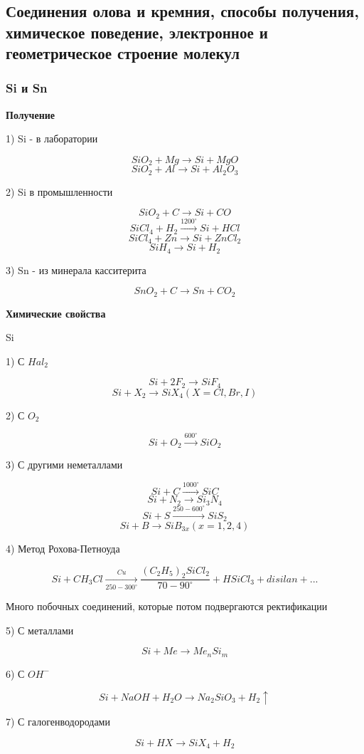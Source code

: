 
\subsection{Соединения олова и кремния, способы получения, химическое поведение, электронное и геометрическое строение молекул}

\subsubsection*{Si и Sn}

\textbf{Получение}

1) Si - в лаборатории

$$SiO_2 + Mg \rightarrow Si + MgO$$
$$SiO_2 + Al \rightarrow Si + Al_2O_3$$

2) Si в промышленности

$$SiO_2 + C \rightarrow Si +  CO$$
$$SiCl_4 + H_2 \xrightarrow{1200^{\circ}} Si + HCl$$
$$SiCl_4 + Zn \rightarrow Si + ZnCl_2$$
$$SiH_4 \rightarrow Si + H_2$$

3) Sn - из минерала касситерита

$$SnO_2 + C \rightarrow Sn + CO_2$$

\textbf{Химические свойства}

Si

1) С $Hal_2$

$$Si + 2F_2 \rightarrow SiF_4$$
$$Si + X_2 \rightarrow SiX_4 (X = Cl, Br, I)$$

2) С $O_2$

$$Si + O_2 \xrightarrow{600^{\circ}} SiO_2$$

3) С другими неметаллами

$$Si + C \xrightarrow{1000^{\circ}} SiC$$
$$Si + N_2 \rightarrow Si_3N_4$$
$$Si + S \xrightarrow{250-600^{\circ}} SiS_2$$
$$Si + B \rightarrow SiB_{3x} (x = 1,2,4)$$

4) Метод Рохова-Петноуда

$$Si + CH_3Cl \xrightarrow[250-300^{\circ}]{Cu} \frac{(C_2H_5)_2SiCl_2}{70-90^{\circ}} + HSiCl_3 + disilan + ...$$

Много побочных соединений, которые потом подвергаются ректификации

5) С металлами

$$Si + Me \rightarrow Me_nSi_m$$

6) С $OH^-$

$$Si + NaOH + H_2O \rightarrow Na_2SiO_3 + H_2 \uparrow$$

7) С галогенводородами

$$Si + HX \rightarrow SiX_4 + H_2$$

